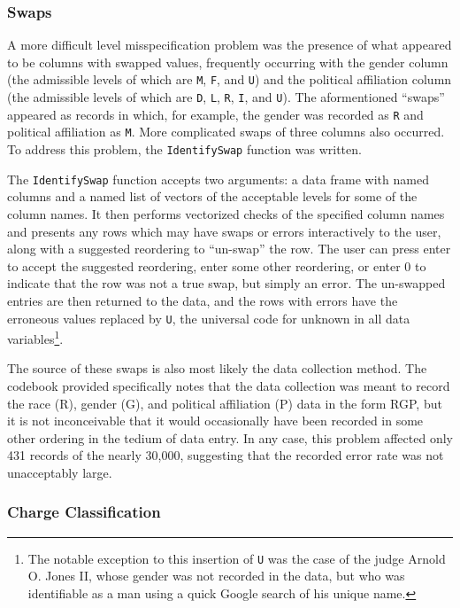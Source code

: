 \subsubsection{Swaps}

A more difficult level misspecification problem was the presence of what appeared to be columns with swapped values, frequently
occurring with the gender column (the admissible levels of which are \texttt{M}, \texttt{F}, and \texttt{U}) and the political affiliation column
(the admissible levels of which are \texttt{D}, \texttt{L}, \texttt{R}, \texttt{I}, and \texttt{U}). The aformentioned ``swaps'' appeared as records in which, for
example, the gender was recorded as \texttt{R} and political affiliation as \texttt{M}. More complicated swaps of three columns also
occurred. To address this problem, the \texttt{IdentifySwap} function was written.

The \texttt{IdentifySwap} function accepts two arguments: a data frame with named columns and a named list of vectors of the
acceptable levels for some of the column names. It then performs vectorized checks of the specified column names and presents any
rows which may have swaps or errors interactively to the user, along with a suggested reordering to ``un-swap'' the row. The user can
press enter to accept the suggested reordering, enter some other reordering, or enter 0 to indicate that the row was not a true
swap, but simply an error. The un-swapped entries are then returned to the data, and the rows with errors have the erroneous
values replaced by \texttt{U}, the universal code for unknown in all data variables\footnote{The notable exception to this
  insertion of \texttt{U} was the case of the judge Arnold O. Jones II, whose gender was not recorded in the data, but who was
  identifiable as a man using a quick Google search of his unique name.}.

The source of these swaps is also most likely the data collection method. The codebook provided specifically notes that the data
collection was meant to record the race (R), gender (G), and political affiliation (P) data in the form RGP, but it is not
inconceivable that it would occasionally have been recorded in some other ordering in the tedium of data entry. In any
case, this problem affected only 431 records of the nearly 30,000, suggesting that the recorded error rate was not unacceptably
large.

\subsubsection{Charge Classification}

